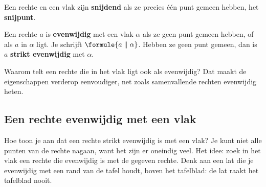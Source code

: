 \begin{theorie}
Een rechte en een vlak zijn \textbf{\textcolor{accent}{snijdend}} als ze precies één punt gemeen hebben, het \textbf{\textcolor{accent}{snijpunt}}.

Een rechte $a$ is \textbf{\textcolor{accent}{evenwijdig}} met een vlak $\alpha$ als ze geen punt gemeen hebben, of als $a$ in $\alpha$ ligt. Je schrijft $\formule{a \parallel \alpha}$. Hebben ze geen punt gemeen, dan is $a$ \textbf{\textcolor{accent}{strikt evenwijdig}} met $\alpha$.
\end{theorie}

Waarom telt een rechte die in het vlak ligt ook als evenwijdig? Dat maakt de eigenschappen verderop eenvoudiger, net zoals samenvallende rechten evenwijdig heten.


\begin{oefeningen}
\end{oefeningen}

\subsection{Een rechte evenwijdig met een vlak}

Hoe toon je aan dat een rechte strikt evenwijdig is met een vlak? Je kunt niet alle punten van de rechte nagaan, want het zijn er oneindig veel. Het idee: zoek in het vlak een rechte die evenwijdig is met de gegeven rechte. Denk aan een lat die je evenwijdig met een rand van de tafel houdt, boven het tafelblad: de lat raakt het tafelblad nooit.

